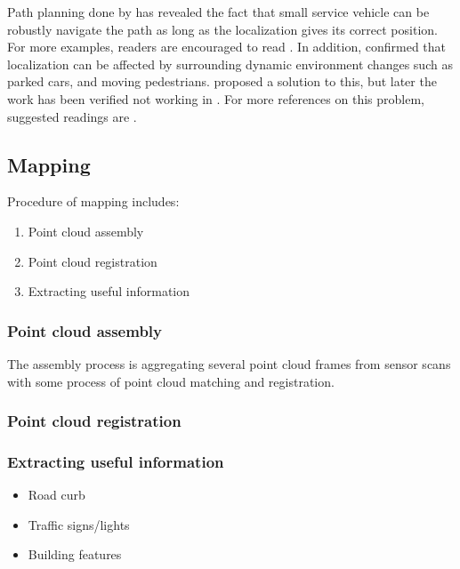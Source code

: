 \documentclass[10 pt,letterpaper,conference]{IEEEtran}
\providecommand{\tightlist}{%
  \setlength{\itemsep}{0pt}\setlength{\parskip}{0pt}}
\begin{document}
Path planning done by \citeauthor{SongZW_IV_2015} has revealed the fact
that small service vehicle can be robustly navigate the path as long as
the localization gives its correct position. For more examples, readers
are encouraged to read \citep{Corley-etal_2011}. In addition,
\citet{Corley-etal_2012} confirmed that localization can be affected by
surrounding dynamic environment changes such as parked cars, and moving
pedestrians. \citet{Aalst-etal_2004} proposed a solution to this, but
later the work has been verified not working in
\citep{Abadi-etal_2008, Abebe-etal_2009}. For more references on this
problem, suggested readings are
\citep{Ackerman-Halverson_1998, Agrawal-etal_1998, Ali-etal_2012, Alipour-etal_2013}.

\subsection{Mapping}\label{mapping}

Procedure of mapping includes:

\begin{enumerate}
\def\labelenumi{\arabic{enumi}.}
\tightlist
\item
  Point cloud assembly
\item
  Point cloud registration
\item
  Extracting useful information
\end{enumerate}

\subsubsection{Point cloud assembly}\label{point-cloud-assembly}

The assembly process is aggregating several point cloud frames from
sensor scans with some process of point cloud matching and registration.

\subsubsection{Point cloud registration}\label{point-cloud-registration}

\subsubsection{Extracting useful
information}\label{extracting-useful-information}

\begin{itemize}
\tightlist
\item
  Road curb
\item
  Traffic signs/lights
\item
  Building features
\end{itemize}
\end{document}
